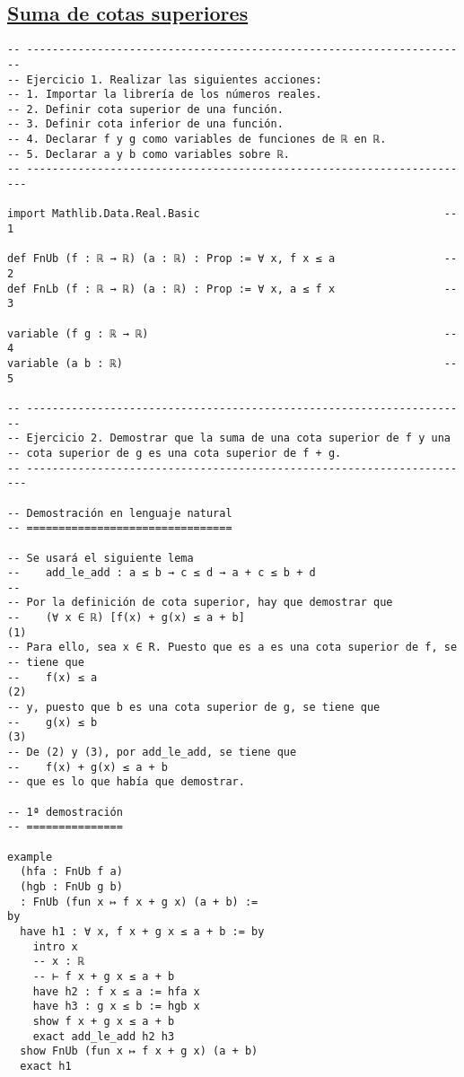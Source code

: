 \subsection{\href{./src/Logica/Suma\_de\_cotas\_superiores.lean}{Suma de cotas superiores}}
\label{sec:orgdb715e5}
\begin{verbatim}
-- ---------------------------------------------------------------------
-- Ejercicio 1. Realizar las siguientes acciones:
-- 1. Importar la librería de los números reales.
-- 2. Definir cota superior de una función.
-- 3. Definir cota inferior de una función.
-- 4. Declarar f y g como variables de funciones de ℝ en ℝ.
-- 5. Declarar a y b como variables sobre ℝ.
-- ----------------------------------------------------------------------

import Mathlib.Data.Real.Basic                                      -- 1

def FnUb (f : ℝ → ℝ) (a : ℝ) : Prop := ∀ x, f x ≤ a                 -- 2
def FnLb (f : ℝ → ℝ) (a : ℝ) : Prop := ∀ x, a ≤ f x                 -- 3

variable (f g : ℝ → ℝ)                                              -- 4
variable (a b : ℝ)                                                  -- 5

-- ---------------------------------------------------------------------
-- Ejercicio 2. Demostrar que la suma de una cota superior de f y una
-- cota superior de g es una cota superior de f + g.
-- ----------------------------------------------------------------------

-- Demostración en lenguaje natural
-- ================================

-- Se usará el siguiente lema
--    add_le_add : a ≤ b → c ≤ d → a + c ≤ b + d
--
-- Por la definición de cota superior, hay que demostrar que
--    (∀ x ∈ ℝ) [f(x) + g(x) ≤ a + b]                                  (1)
-- Para ello, sea x ∈ R. Puesto que es a es una cota superior de f, se
-- tiene que
--    f(x) ≤ a                                                         (2)
-- y, puesto que b es una cota superior de g, se tiene que
--    g(x) ≤ b                                                         (3)
-- De (2) y (3), por add_le_add, se tiene que
--    f(x) + g(x) ≤ a + b
-- que es lo que había que demostrar.

-- 1ª demostración
-- ===============

example
  (hfa : FnUb f a)
  (hgb : FnUb g b)
  : FnUb (fun x ↦ f x + g x) (a + b) :=
by
  have h1 : ∀ x, f x + g x ≤ a + b := by
    intro x
    -- x : ℝ
    -- ⊢ f x + g x ≤ a + b
    have h2 : f x ≤ a := hfa x
    have h3 : g x ≤ b := hgb x
    show f x + g x ≤ a + b
    exact add_le_add h2 h3
  show FnUb (fun x ↦ f x + g x) (a + b)
  exact h1


\end{verbatim}
